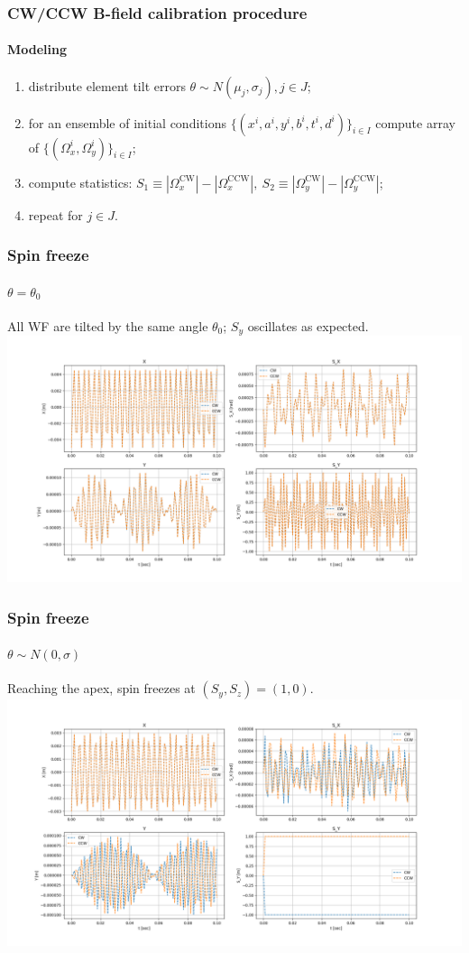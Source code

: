 \documentclass[pdf]{beamer}
\newcommand{\Wx}{\Omega_x}
\newcommand{\Wy}{\Omega_y}
\newcommand{\CW}{^{\mathrm{CW}}}
\newcommand{\CCW}{^{\mathrm{CCW}}}
\begin{document}
\begin{frame}
	\frametitle{CW/CCW B-field calibration procedure}
	\framesubtitle{Modeling}
	\begin{enumerate}
		\item distribute element tilt errors $\theta \sim N(\mu_j, \sigma_j), j \in J$;
		\item for an ensemble of initial conditions $\lbrace (x^i,a^i,y^i,b^i,t^i,d^i)\rbrace_{i\in I}$ compute array of $\lbrace(\Wx^i, \Wy^i)\rbrace_{i\in I}$;
		\item compute statistics: $S_1 \equiv |\Wx\CW| - |\Wx\CCW|,~ S_2 \equiv |\Wy\CW| - |\Wy\CCW|$;
		\item repeat for $j \in J$.
	\end{enumerate}
\end{frame}
\begin{frame}\frametitle{Spin freeze}
	\framesubtitle{$\theta = \theta_0$}
	All WF are tilted by the same angle $\theta_0$; $S_y$ oscillates as expected.
	\centering
	\includegraphics[scale=.3]{freeze/CALIB_ALL_WF_SAME_ANGLE}
\end{frame}
\begin{frame}\frametitle{Spin freeze}
	\framesubtitle{$\theta \sim N(0, \sigma)$}
	Reaching the apex, spin freezes at $(S_y, S_z) = (1, 0)$.
	\centering
	\includegraphics[scale=.3]{freeze/CALIB_MEAN_ZERO_SIGMA_ONE_PYGAUSS_another_run}
\end{frame}
\end{document}
